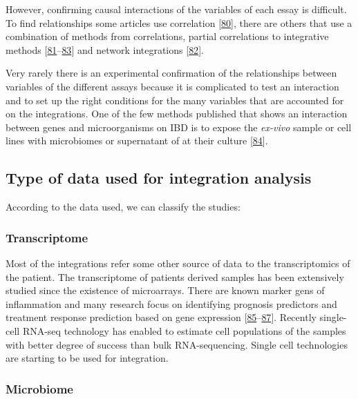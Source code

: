 \documentclass[
  12pt,
  a4paper,
  twoside,
  openright]{book}
\begin{document}
However, confirming causal interactions of the variables of each essay is difficult.
To find relationships some articles use correlation {[}\protect\hyperlink{ref-hasler_uncoupling_2016}{80}{]}, there are others that use a combination of methods from correlations, partial correlations to integrative methods {[}\protect\hyperlink{ref-tang2017}{81}--\protect\hyperlink{ref-huWholeExomeSequencing2021}{83}{]} and network integrations {[}\protect\hyperlink{ref-hernuxe1ndez-rocha2021}{82}{]}.

Very rarely there is an experimental confirmation of the relationships between variables of the different assays because it is complicated to test an interaction and to set up the right conditions for the many variables that are accounted for on the integrations.
One of the few methods published that shows an interaction between genes and microorganisms on IBD is to expose the \emph{ex-vivo} sample or cell lines with microbiomes or supernatant of at their culture {[}\protect\hyperlink{ref-mayorgas2021}{84}{]}.

\hypertarget{data-origin}{%
\subsection{Type of data used for integration analysis}\label{data-origin}}

According to the data used, we can classify the studies:

\hypertarget{transcriptome}{%
\subsubsection{Transcriptome}\label{transcriptome}}

Most of the integrations refer some other source of data to the transcriptomics of the patient.
The transcriptome of patients derived samples has been extensively studied since the existence of microarrays.
There are known marker gens of inflammation and many research focus on identifying prognosis predictors and treatment response prediction based on gene expression {[}\protect\hyperlink{ref-planell2013}{85}--\protect\hyperlink{ref-massimino2021}{87}{]}.
Recently single-cell RNA-seq technology has enabled to estimate cell populations of the samples with better degree of success than bulk RNA-sequencing.
Single cell technologies are starting to be used for integration.

\hypertarget{microbiome-1}{%
\subsubsection{Microbiome}\label{microbiome-1}}
\end{document}
